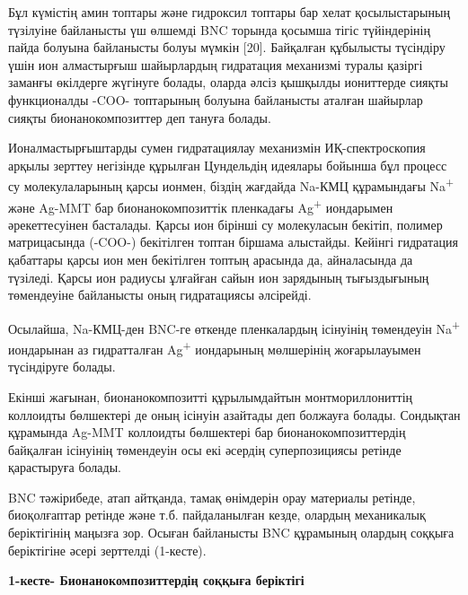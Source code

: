 Бұл күмістің амин топтары және гидроксил топтары бар хелат
қосылыстарының түзілуіне байланысты үш өлшемді BNC торында қосымша тігіс
түйіндерінің пайда болуына байланысты болуы мүмкін {[}20{]}. Байқалған
құбылысты түсіндіру үшін ион алмастырғыш шайырлардың гидратация
механизмі туралы қазіргі заманғы өкілдерге жүгінуге болады, оларда әлсіз
қышқылды иониттерде сияқты функционалды -COO- топтарының болуына
байланысты аталған шайырлар сияқты бионанокомпозиттер деп тануға болады.

Ионалмастырғыштарды сумен гидратациялау механизмін ИҚ-спектроскопия
арқылы зерттеу негізінде құрылған Цундельдің идеялары бойынша бұл
процесс су молекулаларының қарсы ионмен, біздің жағдайда Na-КМЦ
құрамындағы Na\textsuperscript{+} және Ag-MMT бар бионанокомпозиттік
пленкадағы Ag\textsuperscript{+} иондарымен әрекеттесуінен басталады.
Қарсы ион бірінші су молекуласын бекітіп, полимер матрицасында (-COO-)
бекітілген топтан біршама алыстайды. Кейінгі гидратация қабаттары қарсы
ион мен бекітілген топтың арасында да, айналасында да түзіледі. Қарсы
ион радиусы ұлғайған сайын ион зарядының тығыздығының төмендеуіне
байланысты оның гидратациясы әлсірейді.

Осылайша, Na-КМЦ-ден BNC-ге өткенде пленкалардың ісінуінің төмендеуін
Na\textsuperscript{+} иондарынан аз гидратталған Ag\textsuperscript{+}
иондарының мөлшерінің жоғарылауымен түсіндіруге болады.

Екінші жағынан, бионанокомпозитті құрылымдайтын монтмориллониттің
коллоидты бөлшектері де оның ісінуін азайтады деп болжауға болады.
Сондықтан құрамында Ag-MMT коллоидты бөлшектері бар
бионанокомпозиттердің байқалған ісінуінің төмендеуін осы екі әсердің
суперпозициясы ретінде қарастыруға болады.

BNC тәжірибеде, атап айтқанда, тамақ өнімдерін орау материалы ретінде,
биоқолғаптар ретінде және т.б. пайдаланылған кезде, олардың механикалық
беріктігінің маңызға зор. Осыған байланысты BNC құрамының олардың
соққыға беріктігіне әсері зерттелді (1-кесте).

{\bfseries 1-кесте- Бионанокомпозиттердің соққыға беріктігі}

